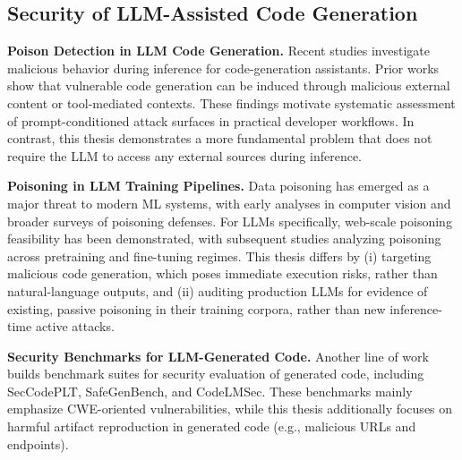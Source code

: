 \subsection{Security of LLM-Assisted Code Generation}

\noindent \textbf{Poison Detection in LLM Code Generation.}
Recent studies investigate malicious behavior during inference 
for code-generation assistants.
Prior works\cite{zeng2025inducing,yi2025benchmarking} show that vulnerable code generation can 
be induced through malicious external content or tool-mediated 
contexts.
These findings motivate systematic assessment of prompt-conditioned 
attack surfaces in practical developer workflows.
In contrast, this thesis demonstrates a more fundamental 
problem that does not require the LLM to 
access any external sources during inference. 


\noindent \textbf{Poisoning in LLM Training Pipelines.}
Data poisoning has emerged as a major threat to modern ML systems, 
with early analyses in computer vision and broader surveys of poisoning 
defenses\cite{cina2023wild,raghavan2022improved,goldblum2022dataset}.
For LLMs specifically, web-scale poisoning feasibility has been 
demonstrated\cite{carlini2024poisoning},
with subsequent studies analyzing poisoning across pretraining and 
fine-tuning regimes\cite{zhao2025data,jiang2024turning}.
This thesis differs by (i) targeting malicious code 
generation, which poses immediate execution risks, rather 
than natural-language outputs, and (ii) auditing production 
LLMs for evidence of existing, passive poisoning in 
their training corpora, rather than new inference-time active attacks.



\noindent \textbf{Security Benchmarks for LLM-Generated Code.}
Another line of work builds benchmark suites for security 
evaluation of generated code,
including SecCodePLT, SafeGenBench, and 
CodeLMSec\cite{yang2024seccodeplt,li2025safegenbench,debenedetti2023a}.
These benchmarks mainly emphasize CWE-oriented vulnerabilities,
while this thesis additionally focuses on harmful 
artifact reproduction in generated code (e.g., malicious URLs and endpoints).
